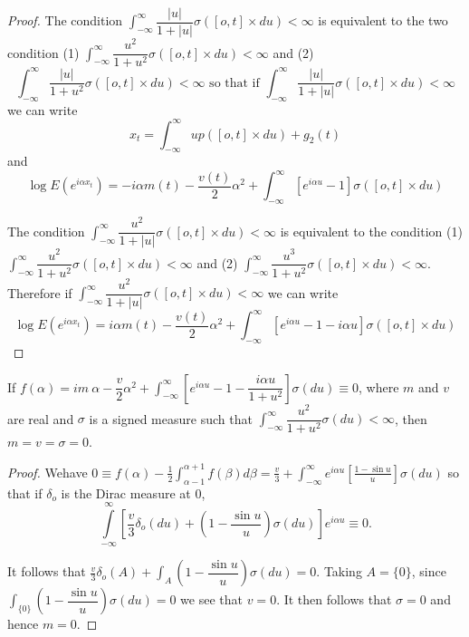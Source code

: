 \begin{proof}
The condition $\int_{- \infty}^\infty \dfrac{| u |}{1+|u|} \sigma
([o,t] \times du) < \infty$ is equivalent to the two condition (1)
$\int_{- \infty}^\infty \dfrac{u^2}{1+u^2} \sigma ([o,t] \times du) <
\infty $ and (2) 
$$
\int_{- \infty}^\infty \dfrac{| u |}{1+u^2} \sigma ([o,t] \times du) <
  \infty \text{ so that if } \int_{- \infty}^\infty \dfrac{| u |}{1+|u|}
  \sigma ([o,t] \times du) < \infty
$$
we can write
$$ 
x_t = \int_{- \infty}^\infty u p ([o,t] \times du) +  g_2 (t)
$$
and
$$  
\log E(e^{i \alpha x_t}) =- i \alpha m (t) - \frac{v(t)}{2} \alpha^2
  +\int_{- \infty}^\infty [e^{i \alpha u}-1] \sigma ([o,t] \times du)
$$ 

The condition $\int_{-\infty}^\infty \dfrac{u^2}{1+|u|} \sigma
([o,t] \times du) < \infty$ is equivalent to the condition (1) $\int_{-
  \infty}^\infty \dfrac{u^2 }{1+u^2} \sigma ([o,t] \times du) <
\infty$ and (2) $\int_{- \infty}^\infty \dfrac{u^3}{1+ u^2} \sigma
([o,t] \times du) < \infty$. Therefore if $\int_{- \infty}^\infty
\dfrac{u^2}{1+ |  u |}\sigma ([o,t] \times du) < \infty$  
we can write
$$
\log E(e^{i \alpha x_t}) = i \alpha m (t) - \frac{v(t)}{2} \alpha^2
+\int_{- \infty}^\infty [e^{i \alpha u}-1- i \alpha u] \sigma ([o,t]
\times du)  
$$ 
\end{proof}

\begin{lemma*}
If $f (\alpha) = im\ \alpha - \dfrac{v}{2} \alpha^2 + \int_{-
    \infty}^\infty [e^{ i \alpha u}-1 - \dfrac{i \alpha u}{1+ u^2}]
  \sigma (du) \equiv 0$, where $m$ and $v$ are real and $\sigma$ is a
  signed measure such that $\int_{- \infty}^{\infty} \dfrac{u^2}{1+u^2}
  \sigma (du) < \infty$, then $m =v = \sigma = 0$. 
\end{lemma*}

\begin{proof}
  We\pageoriginale have $0 \equiv f(\alpha) - \frac{1}{2} \int_{\alpha
    -1}^{\alpha +1} f( \beta) d  \beta= \frac{v}{3} + \int_{- \infty}^{\infty} e^{
    i \alpha u} [ \frac{1- \sin u}{u}] \sigma (du)$ so that if
  $\delta_o$ is the Dirac measure at $0$, 
$$
\int\limits_{- \infty}^{\infty}\left[ \frac{v}{3} \delta_o (du) +  \left(1-
\frac{\sin u}{u}\right) \sigma (du) \right] e^{i \alpha u} \equiv 0. 
$$


It follows that $\frac{v}{3} \delta_o (A) + \int_{A} ( 1- \dfrac{\sin
  u}{u}) \sigma (du) =0$. Taking $A= \{ 0 \}$, since $\int_{\{
  0\}} ( 1- \dfrac{\sin u}{u}) \sigma (du) =0$ we see that $v =0 $. It
then follows that $\sigma = 0 $ and hence $m =0$. 
\end{proof}

